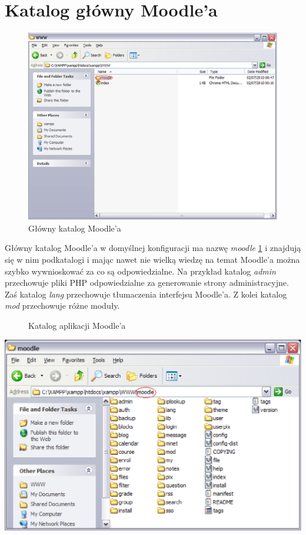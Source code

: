 \section{Katalog główny Moodle'a} \label{roz:katalog_aplikacji}
\begin{figure}[!h]
	\centering
		\caption{Główny katalog Moodle'a} \label{rys:katalog_moodle}
		\includegraphics[width=1\textwidth]{char_narzarzedzi//rys//katalog_aplikacji.eps}
\end{figure}
Główny katalog Moodle'a w domyślnej konfiguracji ma nazwę \textit{moodle} \ref{rys:katalog_moodle} i znajdują się w nim podkatalogi i mając nawet nie wielką wiedzę na temat Moodle'a można szybko wywnioskować za co są odpowiedzialne. Na przykład katalog \textit{admin} przechowuje pliki PHP odpowiedzialne za generowanie strony administracyjne. Zaś katalog \textit{lang} przechowuje tłumaczenia interfejsu Moodle'a. Z kolei katalog \textit{mod} przechowuje różne moduły. \\
\begin{figure}[!h]
	\centering
		\caption{Katalog aplikacji Moodle'a} \label{rys:in_moodle}
\end{figure}
		\includegraphics[width=1\textwidth]{char_narzarzedzi//rys//in_moodle.eps}
